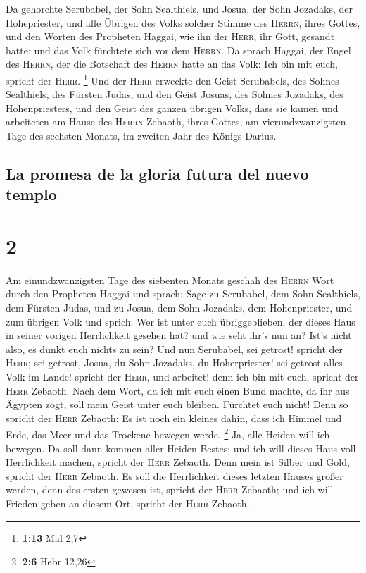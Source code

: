 Da gehorchte Serubabel, der Sohn Sealthiels, und Josua,
der Sohn Jozadaks, der Hohepriester, und alle Übrigen des Volks solcher
Stimme des \textsc{Herrn}, ihres Gottes, und den Worten des Propheten
Haggai, wie ihn der \textsc{Herr}, ihr Gott, gesandt hatte; und das Volk
fürchtete sich vor dem \textsc{Herrn}.  Da sprach Haggai,
der Engel des \textsc{Herrn}, der die Botschaft des \textsc{Herrn} hatte
an das Volk: Ich bin mit euch, spricht der \textsc{Herr}. \footnote{\textbf{1:13}
  Mal 2,7}  Und der \textsc{Herr} erweckte den Geist
Serubabels, des Sohnes Sealthiels, des Fürsten Judas, und den Geist
Josuas, des Sohnes Jozadaks, des Hohenpriesters, und den Geist des
ganzen übrigen Volks, dass sie kamen und arbeiteten am Hause des
\textsc{Herrn} Zebaoth, ihres Gottes,  am
vierundzwanzigsten Tage des sechsten Monats, im zweiten Jahr des Königs
Darius.

\hypertarget{la-promesa-de-la-gloria-futura-del-nuevo-templo}{%
\subsection{La promesa de la gloria futura del nuevo
templo}\label{la-promesa-de-la-gloria-futura-del-nuevo-templo}}

\hypertarget{section-1}{%
\section{2}\label{section-1}}

 Am einundzwanzigsten Tage des siebenten Monats geschah
des \textsc{Herrn} Wort durch den Propheten Haggai und sprach:
 Sage zu Serubabel, dem Sohn Sealthiels, dem Fürsten
Judas, und zu Josua, dem Sohn Jozadaks, dem Hohenpriester, und zum
übrigen Volk und sprich:  Wer ist unter euch
übriggeblieben, der dieses Haus in seiner vorigen Herrlichkeit gesehen
hat? und wie seht ihr's nun an? Ist's nicht also, es dünkt euch nichts
zu sein?  Und nun Serubabel, sei getrost! spricht der
\textsc{Herr}; sei getrost, Josua, du Sohn Jozadaks, du Hoherpriester!
sei getrost alles Volk im Lande! spricht der \textsc{Herr}, und
arbeitet! denn ich bin mit euch, spricht der \textsc{Herr} Zebaoth.
 Nach dem Wort, da ich mit euch einen Bund machte, da ihr
aus Ägypten zogt, soll mein Geist unter euch bleiben. Fürchtet euch
nicht!  Denn so spricht der \textsc{Herr} Zebaoth: Es ist
noch ein kleines dahin, dass ich Himmel und Erde, das Meer und das
Trockene bewegen werde. \footnote{\textbf{2:6} Hebr 12,26}
 Ja, alle Heiden will ich bewegen. Da soll dann kommen
aller Heiden Bestes; und ich will dieses Haus voll Herrlichkeit machen,
spricht der \textsc{Herr} Zebaoth.  Denn mein ist Silber
und Gold, spricht der \textsc{Herr} Zebaoth.  Es soll die
Herrlichkeit dieses letzten Hauses größer werden, denn des ersten
gewesen ist, spricht der \textsc{Herr} Zebaoth; und ich will Frieden
geben an diesem Ort, spricht der \textsc{Herr} Zebaoth.

